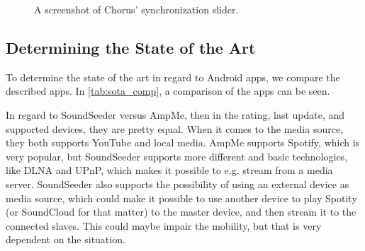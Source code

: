 \begin{figure}[h!]
\begin{minipage}[b]{0.45\textwidth}
        \caption{A screenshot of Chorus' synchronization slider.}\label{fig:chorus_slider}
    \end{minipage}
\end{figure}

\subsection{Determining the State of the Art}
To determine the state of the art in regard to Android apps, we compare the described apps.
In \cref{tab:sota_comp}, a comparison of the apps can be seen. 

In regard to SoundSeeder versus AmpMe, then in the rating, last update, and supported devices, they are pretty equal.
When it comes to the media source, they both supports YouTube and local media. 
AmpMe supports Spotify, which is very popular, but SoundSeeder supports more different and basic technologies,
like DLNA and UPnP, which makes it possible to e.g. stream from a media server.
SoundSeeder also supports the possibility of using an external device as media source,
which could make it possible to use another device to play Spotity (or SoundCloud for that matter) to the master device,
and then stream it to the connected slaves. 
This could maybe impair the mobility, but that is very dependent on the situation.


